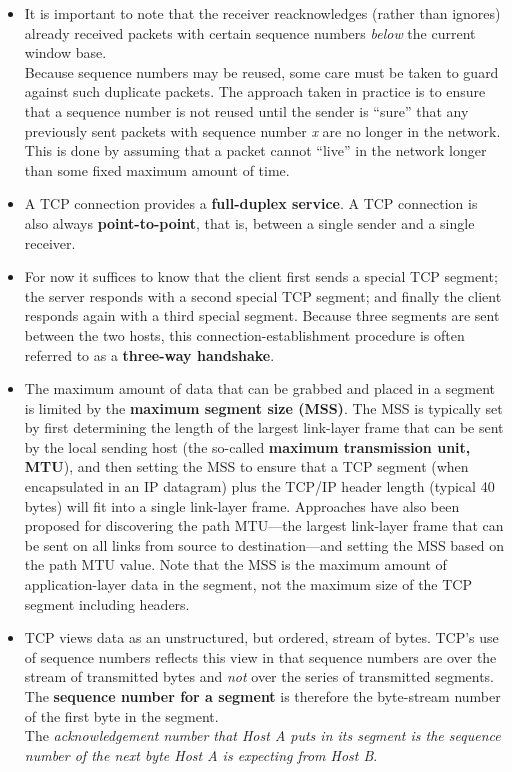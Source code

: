 \begin{itemize}
\item
It is important to note that the receiver reacknowledges (rather than ignores) already received packets with certain sequence numbers \textit{below} the current window base.\\
Because sequence numbers may be reused, some care must be taken to guard against such duplicate packets. The approach taken in practice is to ensure that a sequence number is not reused until the sender is ``sure'' that any previously sent packets with sequence number \textit{x} are no longer in the network. This is done by assuming that a packet cannot ``live'' in the network longer than some fixed maximum amount of time.

\item
A TCP connection provides a \textbf{full-duplex service}. A TCP connection is also always \textbf{point-to-point}, that is, between a single sender and a single receiver.

\item
For now it suffices to know that the client first sends a special TCP segment; the server responds with a second special TCP segment; and finally the client responds again with a third special segment. Because three segments are sent between the two hosts, this connection-establishment procedure is often referred to as a \textbf{three-way handshake}.

\item
The maximum amount of data that can be grabbed and placed in a segment is limited by the \textbf{maximum segment size (MSS)}. The MSS is typically set by first determining the length of the largest link-layer frame that can be sent by the local sending host (the so-called \textbf{maximum transmission unit, MTU}), and then setting the MSS to ensure that a TCP segment (when encapsulated in an IP datagram) plus the TCP/IP header length (typical 40 bytes) will fit into a single link-layer frame. Approaches have also been proposed for discovering the path MTU---the largest link-layer frame that can be sent on all links from source to destination---and setting the MSS based on the path MTU value. Note that the MSS is the maximum amount of application-layer data in the segment, not the maximum size of the TCP segment including headers.

\item
TCP views data as an unstructured, but ordered, stream of bytes. TCP's use of sequence numbers reflects this view in that sequence numbers are over the stream of transmitted bytes and \textit{not} over the series of transmitted segments. The \textbf{sequence number for a segment} is therefore the byte-stream number of the first byte in the segment.\\
The \textit{acknowledgement number that Host A puts in its segment is the sequence number of the next byte Host A is expecting from Host B}.


\end{itemize}
